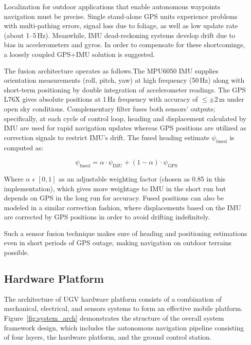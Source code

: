 \documentclass[runningheads]{llncs}
\begin{document}
Localization for outdoor applications that enable autonomous waypoints navigation must be precise. Single stand-alone GPS units experience problems with multi-pathing errors, signal loss due to foliage, as well as low update rate (about 1--5\,Hz). Meanwhile, IMU dead-reckoning systems develop drift due to bias in accelerometers and gyros. In order to compensate for these shortcomings, a loosely coupled GPS+IMU solution is suggested.

The fusion architecture operates as follows.The MPU6050 IMU supplies orientation measurements (roll, pitch, yaw) at high frequency (50\,Hz) along with short-term positioning by double integration of accelerometer readings. The GPS L76X gives absolute positions at 1\,Hz frequency with accuracy of $\leq\pm$2\,m under open sky conditions. Complementary filter fuses both sensors' outputs; specifically, at each cycle of control loop, heading and displacement calculated by IMU are used for rapid navigation updates whereas GPS positions are utilized as correction signals to restrict IMU's drift. The fused heading estimate $\psi_{\text{fused}}$ is computed as:

\begin{equation}
\psi_{\text{fused}} = \alpha \cdot \psi_{\text{IMU}} + (1 - \alpha) \cdot \psi_{\text{GPS}}
\end{equation}

Where $\alpha$ $\epsilon$ $[0, 1]$ as an adjustable weighting factor (chosen as 0.85 in this implementation), which gives more weightage to IMU in the short run but depends on GPS in the long run for accuracy. Fused positions can also be modeled in a similar correction fashion, where displacements based on the IMU are corrected by GPS positions in order to avoid drifting indefinitely.

Such a sensor fusion technique makes sure of heading and positioning estimations even in short periods of GPS outage, making navigation on outdoor terrains possible.

\subsection{Hardware Platform}

The architecture of UGV hardware platform consists of a combination of mechanical, electrical, and sensors systems to form an effective mobile platform. Figure~\ref{fig:system_arch} demonstrates  the structure of the overall system framework design, which includes the autonomous navigation pipeline consisting of four layers, the hardware platform, and the ground control station.
\end{document}

